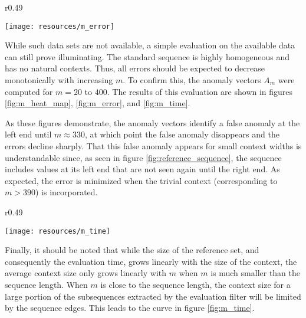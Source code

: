 \begin{wrapfigure}{r}{0.49\textwidth} \vspace{-20pt}
    \vspace{-10pt}
    \begin{center}
        \texttt{[image: resources/m\_error]}
    \end{center}
    \vspace{-20pt}
    \caption{\small{Errors of the anomaly vectors $A_m$.}}
    \vspace{-20pt}
    \label{fig:m_error}
\end{wrapfigure}

While such data sets are not available, a simple evaluation on the available data can still prove illuminating. The standard sequence is highly homogeneous and has no natural contexts. Thus, all errors should be expected to decrease monotonically with increasing $m$. To confirm this, the anomaly vectors $A_m$ were computed for $m = 20$ to $400$. The results of this evaluation are shown in figures \ref{fig:m_heat_map}, \ref{fig:m_error}, and \ref{fig:m_time}. 

As these figures demonstrate, the anomaly vectors identify a false anomaly at the left end until $m \approx 330$, at which point the false anomaly disappears and the errors decline sharply. That this false anomaly appears for small context widths is understandable since, as seen in figure \ref{fig:reference_sequence}, the sequence includes values at its left end that are not seen again until the right end. As expected, the error is minimized when the trivial context (corresponding to $m > 390$) is incorporated.

\begin{wrapfigure}{r}{0.49\textwidth}
    \vspace{-30pt}
    \begin{center}
        \texttt{[image: resources/m\_time]}
    \end{center}
    \vspace{-20pt}
    \caption{\small{Evaluation times of the anomaly vectors $A_m$.}}
    \vspace{-20pt}
    \label{fig:m_time}
\end{wrapfigure}

Finally, it should be noted that while the size of the reference set, and consequently the evaluation time, grows linearly with the size of the context, the average context size only grows linearly with $m$ when $m$ is much smaller than the sequence length. When $m$ is close to the sequence length, the context size for a large portion of the subsequences extracted by the evaluation filter will be limited by the sequence edges. This leads to the curve in figure \ref{fig:m_time}.

